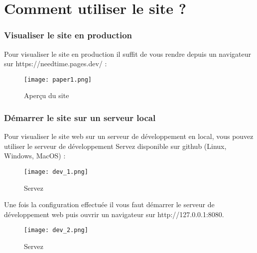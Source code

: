 \documentclass[
	article,			%
	11pt,				%
	oneside,			%
	a4paper,			%
	chapter=TITLE,
	french,			%
	sumario=tradicional
	]{base_nt}
\begin{document}
\newpage

\part{Comment utiliser le site ?}

\section{Visualiser le site en production}

Pour visualiser le site en production il suffit de vous rendre depuis un navigateur sur https://needtime.pages.dev/ :

\vspace{0cm}
\begin{figure}[ht]
	\caption{Aperçu du site}
	\centering
	\texttt{[image: paper1.png]}
	
\end{figure}

\newpage

\section{Démarrer le site sur un serveur local}

Pour visualiser le site web sur un serveur de développement en local, vous pouvez utiliser le serveur de développement Servez disponible sur github (Linux, Windows, MacOS) :
\vspace{0cm}
\begin{figure}[ht]
	\caption{Servez}
	\centering
	\texttt{[image: dev\_1.png]}
	
\end{figure}

\newpage

Une fois la configuration effectuée il vous faut démarrer le serveur de développement web puis ouvrir un navigateur sur http://127.0.0.1:8080.

\vspace{0cm}
\begin{figure}[ht]
	\caption{Servez}
	\centering
	\texttt{[image: dev\_2.png]}
	
\end{figure}

\newpage
\end{document}
